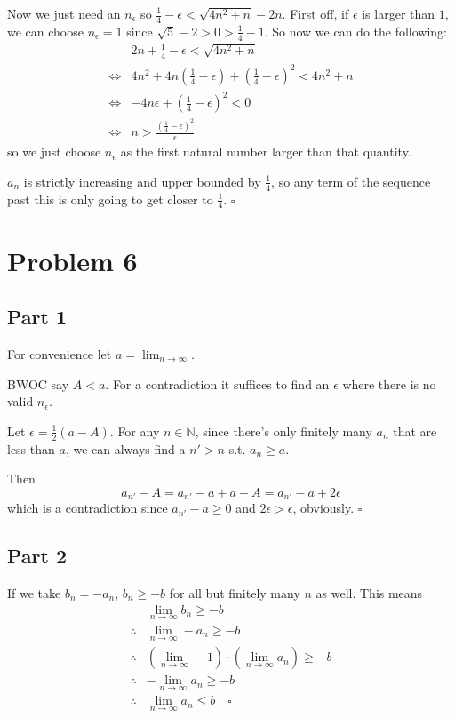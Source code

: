 \documentclass[12pt]{article}
\newcommand{\N}{\mathbb{N}}
\begin{document}
Now we just need an $n_\epsilon$ so $\frac{1}{4}-\epsilon < \sqrt{4n^2+n}-2n$.
First off, if $\epsilon$ is larger than $1$, we can choose $n_\epsilon=1$
since $\sqrt{5}-2>0>\frac{1}{4}-1$.
So now we can do the following:
\begin{align*}
         & 2n+\frac{1}{4}-\epsilon < \sqrt{4n^2+n}                                               \\
  \iff{} & 4n^2+4n\left(\frac{1}{4}-\epsilon\right)+\left(\frac{1}{4}-\epsilon\right)^2 < 4n^2+n \\
  \iff{} & -4n\epsilon+\left(\frac{1}{4}-\epsilon\right)^2 < 0                                   \\
  \iff{} & n > \frac{\left(\frac{1}{4}-\epsilon\right)^2}{\epsilon}
\end{align*}
so we just choose $n_\epsilon$ as the first natural number larger than that quantity.

$a_n$ is strictly increasing and upper bounded by $\frac{1}{4}$,
so any term of the sequence past this is only going to get closer to $\frac{1}{4}$. $\square$

\pagebreak

\section{Problem 6}

\subsection{Part 1}

For convenience let $a=\lim_{n \to \infty}$.

BWOC say $A < a$.
For a contradiction it suffices to find an $\epsilon$ where there is no valid $n_\epsilon$.

Let $\epsilon=\frac{1}{2}(a-A)$.
For any $n \in \N$, since there's only finitely many $a_n$ that are less than $a$,
we can always find a $n' > n$ s.t. $a_n \ge a$.

Then
\[a_{n'} - A = a_{n'} - a + a - A = a_{n'} - a + 2\epsilon\]
which is a contradiction since $a_{n'}-a \ge 0$ and $2\epsilon > \epsilon$, obviously. $\square$

\subsection{Part 2}

If we take $b_n=-a_n$, $b_n \ge -b$ for all but finitely many $n$ as well.
This means
\begin{align*}
               & \lim_{n \to \infty} b_n \ge -b                                                        \\
  \therefore{} & \lim_{n \to \infty} -a_n \ge -b                                                       \\
  \therefore{} & \left(\lim_{n \to \infty} -1\right) \cdot \left(\lim_{n \to \infty} a_n\right) \ge -b \\
  \therefore{} & -\lim_{n \to \infty} a_n \ge -b                                                       \\
  \therefore{} & \lim_{n \to \infty} a_n \le b\quad\square
\end{align*}
\end{document}
